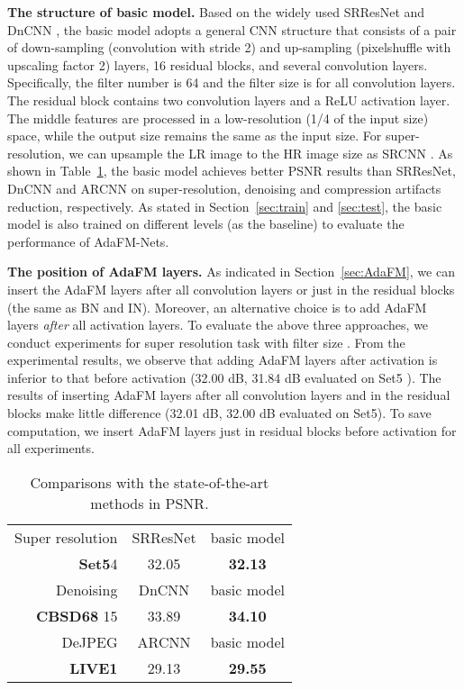 \documentclass[10pt,twocolumn,letterpaper]{article}
\begin{document}
\textbf{The structure of basic model.}
Based on the widely used SRResNet and DnCNN \cite{zhang2017beyond}, the basic model  adopts a general CNN structure that consists of a pair of down-sampling (convolution with stride 2) and up-sampling (pixelshuffle \cite{shi2016real} with upscaling factor 2) layers, 16 residual blocks, and several convolution layers. Specifically, the filter number is 64 and the filter size is  for all convolution layers. The residual block contains two convolution layers and a ReLU activation layer. The middle features are processed in a low-resolution (1/4 of the input size) space, while the output size remains the same as the input size. For super-resolution, we can upsample the LR image to the HR image size as SRCNN \cite{dong2014learning}. As shown in Table~\ref{tabel:basic}, the basic model achieves better PSNR results than SRResNet, DnCNN and ARCNN on super-resolution, denoising and compression artifacts reduction, respectively. As stated in Section~\ref{sec:train} and \ref{sec:test}, the basic model is also trained on different levels (as the baseline) to evaluate the performance of AdaFM-Nets. 

\textbf{The position of AdaFM layers.}
As indicated in Section~\ref{sec:AdaFM}, we can insert the AdaFM layers after all convolution layers or just in the residual blocks (the same as BN and IN). Moreover, an alternative choice is to add AdaFM layers \textit{after} all activation layers. To evaluate the above three approaches, we conduct experiments for super resolution task  with filter size .
From the experimental results, we observe that adding AdaFM layers after activation is inferior to that before activation (32.00 dB, 31.84 dB evaluated on Set5 \cite{bevilacqua2012low}). The results of inserting AdaFM layers after all convolution layers and in the residual blocks make little difference (32.01 dB, 32.00 dB evaluated on Set5). To save computation, we insert AdaFM layers just in residual blocks before activation for all experiments.

\begin{table}[]
\small
\centering
\begin{tabular}{r|c|c}
\hline
\hline
Super resolution & SRResNet & basic model \\ 
\textbf{Set5}4& 32.05 & \textbf{32.13}\\
\hline
Denoising & DnCNN & basic model \\ 
\textbf{CBSD68} 15 & 33.89 & \textbf{34.10}\\
\hline
DeJPEG & ARCNN & basic model \\
\textbf{LIVE1}  & 29.13 & \textbf{29.55}\\
\hline
\end{tabular}
\vspace{-1em}
\caption{Comparisons with the state-of-the-art methods in PSNR.}
\label{tabel:basic}
\end{table}
\end{document}
